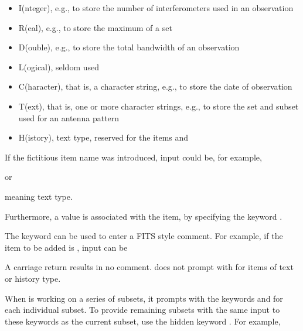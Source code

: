 \begin{itemize}

\item I(nteger), e.g., to store the number of interferometers used in an
observation

\item R(eal), e.g., to store the maximum of a set

\item D(ouble), e.g., to store the total bandwidth of an observation

\item L(ogical), seldom used

\item C(haracter), that is, a character string, e.g., to store the date
of observation

\item T(ext), that is, one or more character strings, e.g., to store the
set and subset used for an antenna pattern

\item H(istory), text type, reserved for the items 
and 

\end{itemize}

If the fictitious item name  was introduced, input
could be, for example,


or


meaning text type.

Furthermore, a value is associated with the item, by specifying the
keyword . 

The keyword  can be used to enter a FITS style
comment.  For example, if the item to be added is ,
input can be


A carriage return results in no comment.   does not
prompt with  for items of text or history type. 

When  is working on a series of subsets, it prompts with
the keywords  and  for each individual
subset.  To provide remaining subsets with the same input to these
keywords as the current subset, use the hidden keyword . 
For example,



